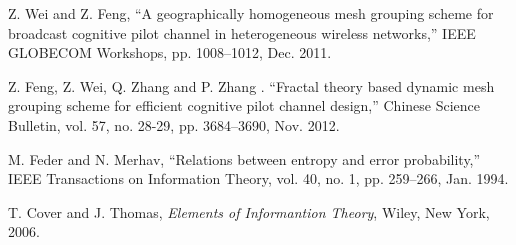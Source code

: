 \documentclass[conference]{IEEEtran}
\begin{document}
\begin{thebibliography}{99}
Z. Wei and Z. Feng,
``A geographically homogeneous mesh grouping scheme for broadcast cognitive pilot channel in heterogeneous wireless networks,''
IEEE GLOBECOM Workshops, pp. 1008--1012, Dec. 2011.

Z. Feng, Z. Wei, Q. Zhang and P. Zhang . ``Fractal theory based dynamic mesh grouping scheme for efficient cognitive pilot channel design,'' Chinese Science Bulletin, vol. 57, no. 28-29, pp. 3684--3690, Nov. 2012.

M. Feder and N. Merhav,
``Relations between entropy and error probability,''
IEEE Transactions on Information Theory, vol. 40, no. 1, pp. 259--266, Jan. 1994.

T. Cover and J. Thomas,
{\em Elements of Informantion Theory},
Wiley, New York, 2006.


\end{thebibliography}
\end{document}
